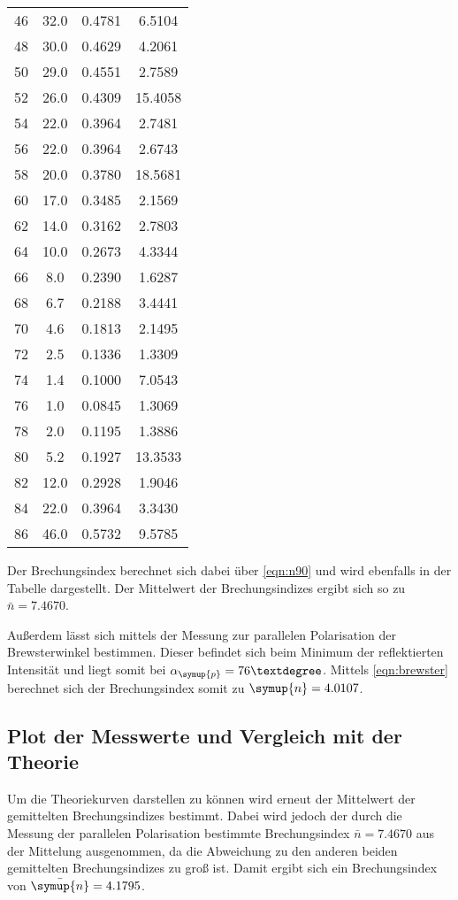 \begin{table}
\begin{tabular}{c c c c}
        \midrule
        46&32.0&0.4781&6.5104 \\
        48&30.0&0.4629&4.2061 \\
        50&29.0&0.4551&2.7589 \\
       52&26.0&0.4309&15.4058 \\
        54&22.0&0.3964&2.7481 \\
        56&22.0&0.3964&2.6743 \\
       58&20.0&0.3780&18.5681 \\
        60&17.0&0.3485&2.1569 \\
        62&14.0&0.3162&2.7803 \\
        64&10.0&0.2673&4.3344 \\
         66&8.0&0.2390&1.6287 \\
         68&6.7&0.2188&3.4441 \\
         70&4.6&0.1813&2.1495 \\
         72&2.5&0.1336&1.3309 \\
         74&1.4&0.1000&7.0543 \\
         76&1.0&0.0845&1.3069 \\
         78&2.0&0.1195&1.3886 \\
        80&5.2&0.1927&13.3533 \\
        82&12.0&0.2928&1.9046 \\
        84&22.0&0.3964&3.3430 \\
        86&46.0&0.5732&9.5785 \\
        \bottomrule
    \end{tabular}
    \label{tab:Pol90}
\end{table}
Der Brechungsindex berechnet sich dabei über \autoref{eqn:n90} und wird ebenfalls in der Tabelle dargestellt. 
Der Mittelwert der Brechungsindizes ergibt sich so zu $\bar{n}= 7.4670$.

Außerdem lässt sich mittels der Messung zur parallelen Polarisation der Brewsterwinkel bestimmen. Dieser befindet sich beim Minimum der 
reflektierten Intensität und liegt somit bei $\alpha_{\symup{p}} = 76°$. Mittels \autoref{eqn:brewster} berechnet sich der Brechungsindex somit zu  
$\symup{n} = 4.0107$.

\subsection{Plot der Messwerte und Vergleich mit der Theorie}
Um die Theoriekurven darstellen zu können wird erneut der Mittelwert der gemittelten Brechungsindizes bestimmt. Dabei wird jedoch der durch die Messung
der parallelen Polarisation bestimmte Brechungsindex $\bar{n}= 7.4670$ aus der Mittelung ausgenommen, da die Abweichung zu den anderen beiden gemittelten
Brechungsindizes zu groß ist.  Damit ergibt sich ein Brechungsindex von
$\bar{\symup{n}} = 4.1795$.

